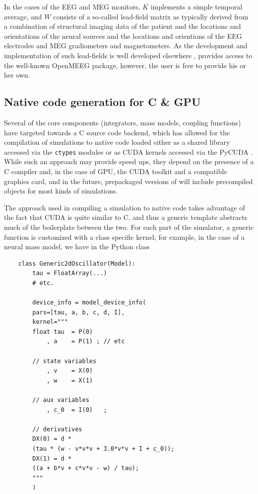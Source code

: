 	In the cases of the EEG and MEG monitors, $K$ implements a simple
	temporal average, and $W$ consists of a so-called lead-field matrix as typically
	derived from a combination of structural imaging data of the patient 
	and the locations and orientations of the neural sources and the locations
	and orientions of the EEG electrodes and MEG gradiometers and magnetometers. 
	As the development and implementation of such lead-fields is well developed
	elsewhere \cite{Jirsa_2002,Nolte2003,Gramfort_2010}, \TVB provides access
	to the well-known OpenMEEG package, however, the user is free to provide 
	his or her own.

\subsection{Native code generation for C \& GPU}

	Several of the core components (integrators, mass models, coupling
	functions) have targeted towards a C source code backend, which has
	allowed for the compilation of simulations to native code loaded 
	either as a shared library accessed via the \texttt{ctypes} modules
	or as CUDA kernels accessed via the PyCUDA \cite{PyCUDA}.
	While such an approach may provide speed ups, they depend on the
	presence of a C compiler and, in the case of GPU, the CUDA toolkit and
	a compatible graphics card, and in the future, prepackaged versions of \TVB
	will include precompiled objects for most kinds of simulations. 

	The approach used in compiling a simulation to native code takes advantage
	of the fact that CUDA is quite similar to C, and thus a generic template
	abstracts much of the boilerplate between the two. For each part of the 
	simulator, a generic function is customized with a class specific kernel;
	for example, in the case of a neural mass model, we have in the Python class

	\begin{lstlisting}
	class Generic2dOscillator(Model):
	    tau = FloatArray(...)
	    # etc.

	    device_info = model_device_info(
		pars=[tau, a, b, c, d, I],
		kernel="""
		float tau  = P(0)
		    , a    = P(1) ; // etc

		// state variables
		    , v    = X(0)
		    , w    = X(1)

		// aux variables
		    , c_0  = I(0)   ;

		// derivatives
		DX(0) = d * 
		(tau * (w - v*v*v + 3.0*v*v + I + c_0));
		DX(1) = d * 
		((a + b*v + c*v*v - w) / tau);
		"""
	    )
	\end{lstlisting}


